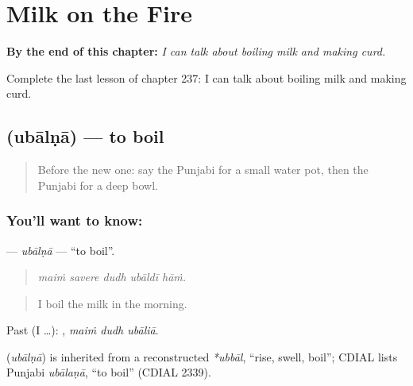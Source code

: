 
\chapter{Milk on the Fire}
\label{ch:pa-a2-milk-on-the-fire}

\begin{chapteropening}
\textbf{By the end of this chapter:} \emph{I can talk about boiling milk and making curd.}

Complete the last lesson of chapter 237: I can talk about boiling milk and making curd.
\end{chapteropening}

\section[\texorpdfstring{\pa{ਉਬਾਲਣਾ} (ubālṇā)}{ਉਬਾਲਣਾ (ubālṇā)}]{ (ubālṇā) — to boil}

\label{lesson:PA-C237-ubalna}



\begin{quote}
Before the new one: say the Punjabi for a small water pot, then the Punjabi for a deep bowl.
\end{quote}

\subsection*{You'll want to know: }
\textbf{} — \emph{ubālṇā} — \textquotedblleft{}to boil\textquotedblright{}.

\begin{quote}
    
\end{quote}

\begin{quote}
\emph{maiṁ savere dudh ubāldī hāṁ.}
\end{quote}

\begin{quote}
I boil the milk in the morning.
\end{quote}

Past (I …):   , \emph{maiṁ dudh ubāliā}.

\begin{cousinweb}
\textbf{} (\emph{ubālṇā}) is inherited from a reconstructed \emph{*ubbāl}, \textquotedblleft{}rise, swell, boil\textquotedblright{}; CDIAL lists Punjabi \emph{ubālaṇā}, \textquotedblleft{}to boil\textquotedblright{} (CDIAL 2339).
\end{cousinweb}

